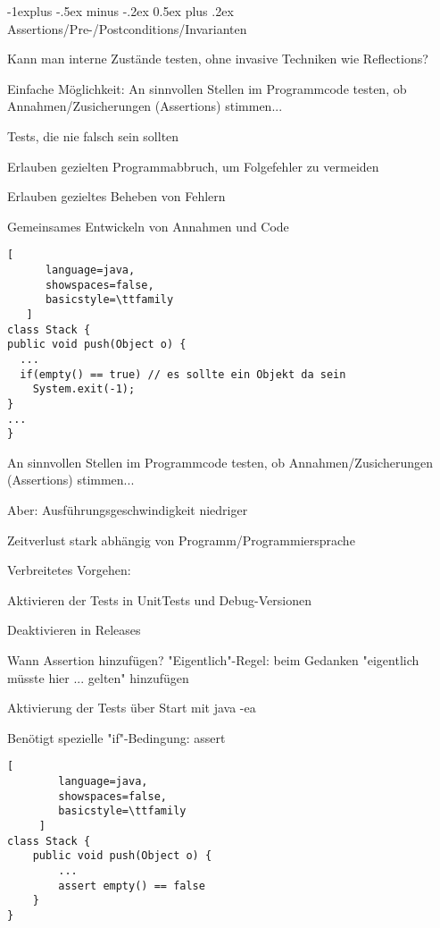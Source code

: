 \documentclass[10pt]{article}
\makeatletter
\renewcommand{\subsection}{\@startsection{subsection}{2}{0mm}%
                                {-1explus -.5ex minus -.2ex}%
                                {0.5ex plus .2ex}%
                                {\normalfont\normalsize\bfseries}}
\makeatother
\begin{document}
\subsection{Assertions/Pre-/Postconditions/Invarianten}
\begin{itemize*}
  \item Kann man interne Zustände testen, ohne invasive Techniken wie Reflections?
  \item Einfache Möglichkeit: An sinnvollen Stellen im Programmcode testen, ob Annahmen/Zusicherungen (Assertions) stimmen...
  \item Tests, die nie falsch sein sollten
  \begin{itemize*}
    \item Erlauben gezielten Programmabbruch, um Folgefehler zu vermeiden
    \item Erlauben gezieltes Beheben von Fehlern
    \item Gemeinsames Entwickeln von Annahmen und Code
  \end{itemize*}
\end{itemize*}

\begin{lstlisting}[
      language=java,
      showspaces=false,
      basicstyle=\ttfamily
   ]
class Stack {
public void push(Object o) {
  ...
  if(empty() == true) // es sollte ein Objekt da sein
    System.exit(-1);
}
...
}
\end{lstlisting}



An sinnvollen Stellen im Programmcode testen, ob Annahmen/Zusicherungen (Assertions) stimmen...

Aber: Ausführungsgeschwindigkeit niedriger
\begin{itemize*}
  \item Zeitverlust stark abhängig von Programm/Programmiersprache
  \item Verbreitetes Vorgehen:
  \begin{itemize*}
    \item Aktivieren der Tests in UnitTests und Debug-Versionen
    \item Deaktivieren in Releases
  \end{itemize*}
  \item Wann Assertion hinzufügen? "Eigentlich"-Regel: beim Gedanken "eigentlich müsste hier ... gelten" hinzufügen
  \item Aktivierung der Tests über Start mit java -ea
  \item Benötigt spezielle "if"-Bedingung: assert
\end{itemize*}
\begin{lstlisting}[
        language=java,
        showspaces=false,
        basicstyle=\ttfamily
     ]
class Stack {
    public void push(Object o) {
        ...
        assert empty() == false
    }
}
\end{lstlisting}
\end{document}
